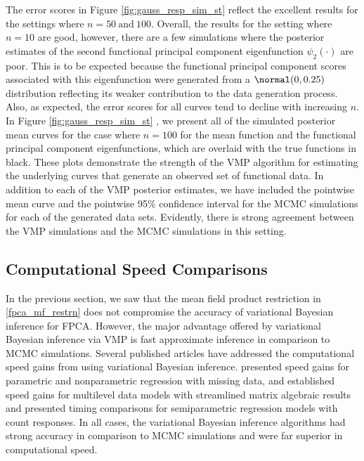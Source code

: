 \documentclass[12pt]{article}
\theoremstyle{plain}
\theoremstyle{definition}
\theoremstyle{remark}
\begin{document}
The error scores in Figure \ref{fig:gauss_resp_sim_st}  reflect the excellent results for the
settings where $n = 50 \ \text{and} \ 100$. Overall, the results for the setting where $n = 10$ are good, however,
there are a few simulations where the posterior estimates of the second functional principal component
eigenfunction $\psi_2 (\cdot)$ are poor. This is to be expected because the functional principal component scores
associated with this eigenfunction were generated from a $\normal (0, 0.25)$ distribution reflecting its weaker
contribution to the data generation process. Also, as expected, the error scores for all curves tend to decline with
increasing $n$. In Figure \ref{fig:gauss_resp_sim_st} , we present all of the simulated
posterior mean curves for the case where $n = 100$
for the mean function and the functional principal component eigenfunctions, which are
overlaid with the true functions in black. These plots demonstrate the strength of the VMP algorithm for estimating
the underlying curves that generate an observed set of functional data. In addition to each of the VMP posterior
estimates, we have included the pointwise mean curve and the pointwise 95\% confidence interval for the MCMC
simulations for each of the generated data sets. Evidently, there is strong agreement between the VMP simulations
and the MCMC simulations in this setting.


\subsection{Computational Speed Comparisons}
\label{sec:speed_comp}

In the previous section, we saw that the mean field product restriction in \eqref{fpca_mf_restrn} does not
compromise the accuracy of variational Bayesian inference for FPCA. However,
the major advantage offered by variational Bayesian inference via VMP is fast approximate inference in 
comparison to MCMC simulations. Several published articles have addressed the computational speed gains
from using variational Bayesian inference.  presented speed gains for parametric and nonparametric
regression with missing data,  and  established speed gains for multilevel data models
with streamlined matrix algebraic results and  presented timing comparisons for semiparametric regression
models with count responses. In all cases, the variational Bayesian inference algorithms had strong accuracy in
comparison to MCMC simulations and were far superior in computational speed.
\end{document}
